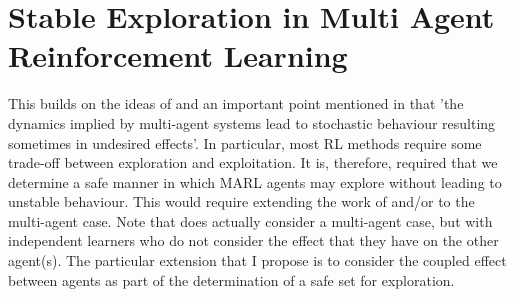 \documentclass[../sample.tex]{subfiles}
\begin{document}
\section{Stable Exploration in Multi Agent Reinforcement Learning}


This builds on the ideas of \cite{Berkenkamp2017,Jin2018Stability-certifiedPerspective} and an
important point mentioned in \cite{Marinescu2014} that 'the dynamics implied by multi-agent systems
lead to stochastic behaviour resulting sometimes in undesired effects'. In particular, most RL
methods require some trade-off between exploration and exploitation. It is, therefore, required that
we determine a safe manner in which MARL agents may explore without leading to unstable behaviour.
This would require extending the work of \cite{Berkenkamp2017} and/or
\cite{Jin2018Stability-certifiedPerspective} to the multi-agent case. Note that
\cite{Jin2018Stability-certifiedPerspective} does actually consider a multi-agent case, but with
independent learners who do not consider the effect that they have on the other agent(s). The
particular extension that I propose is to consider the coupled effect between agents as part of the
determination of a safe set for exploration.
\end{document}
